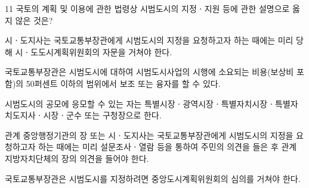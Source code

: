 \begin{question}{11}
국토의 계획 및 이용에 관한 법령상 시범도시의 지정ㆍ지원 등에 관한 설명으로 옳지 않은 것은?
\begin{choices}
  \item 시ㆍ도지사는 국토교통부장관에게 시범도시의 지정을 요청하고자 하는 때에는 미리 당해 시ㆍ도도시계획위원회의 자문을 거쳐야 한다.
  \item 국토교통부장관은 시범도시에 대하여 시범도시사업의 시행에 소요되는 비용(보상비 포함)의 50퍼센트 이하의 범위에서 보조 또는 융자를 할 수 있다.
  \item 시범도시의 공모에 응모할 수 있는 자는 특별시장ㆍ광역시장ㆍ특별자치시장ㆍ특별자치도지사ㆍ시장ㆍ군수 또는 구청장으로 한다.
  \item 관계 중앙행정기관의 장 또는 시ㆍ도지사는 국토교통부장관에게 시범도시의 지정을 요청하고자 하는 때에는 미리 설문조사ㆍ열람 등을 통하여 주민의 의견을 들은 후 관계 지방자치단체의 장의 의견을 들어야 한다.
  \item 국토교통부장관은 시범도시를 지정하려면 중앙도시계획위원회의 심의를 거쳐야 한다.
\end{choices}
\end{question}
